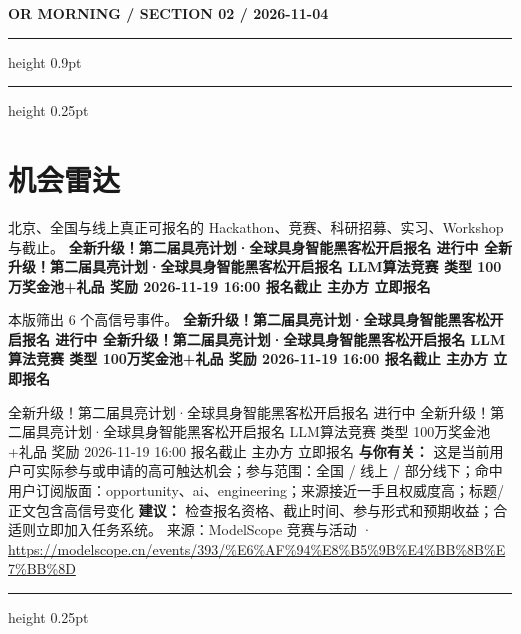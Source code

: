 \documentclass[10.5pt]{ctexart}
\begin{document}
\newpage
{\small\bfseries OR MORNING / SECTION 02 / 2026-11-04}
\vspace{2mm}
\hrule height 0.9pt
\vspace{1.5mm}
\hrule height 0.25pt
\vspace{4mm}
\section*{机会雷达}
{\color{ormuted} 北京、全国与线上真正可报名的 Hackathon、竞赛、科研招募、实习、Workshop 与截止。}
\vspace{2mm}
{\LARGE\bfseries 全新升级！第二届具亮计划·全球具身智能黑客松开启报名 进行中 全新升级！第二届具亮计划·全球具身智能黑客松开启报名 LLM算法竞赛 类型 100万奖金池+礼品 奖励 2026-11-19 16:00 报名截止 主办方 立即报名}\par
\vspace{1mm}
{\color{ormuted} 本版筛出 6 个高信号事件。}
\vspace{3mm}
{\Large\bfseries 全新升级！第二届具亮计划·全球具身智能黑客松开启报名 进行中 全新升级！第二届具亮计划·全球具身智能黑客松开启报名 LLM算法竞赛 类型 100万奖金池+礼品 奖励 2026-11-19 16:00 报名截止 主办方 立即报名}\par
全新升级！第二届具亮计划·全球具身智能黑客松开启报名 进行中 全新升级！第二届具亮计划·全球具身智能黑客松开启报名 LLM算法竞赛 类型 100万奖金池+礼品 奖励 2026-11-19 16:00 报名截止 主办方 立即报名
\textbf{与你有关：} 这是当前用户可实际参与或申请的高可触达机会；参与范围：全国 / 线上 / 部分线下；命中用户订阅版面：opportunity、ai、engineering；来源接近一手且权威度高；标题/正文包含高信号变化
\textbf{建议：} 检查报名资格、截止时间、参与形式和预期收益；合适则立即加入任务系统。
{\footnotesize\color{ormuted} 来源：ModelScope 竞赛与活动 · \url{https://modelscope.cn/events/393/%E6%AF%94%E8%B5%9B%E4%BB%8B%E7%BB%8D}}
\vspace{4mm}
\hrule height 0.25pt
\vspace{3mm}
\end{document}
